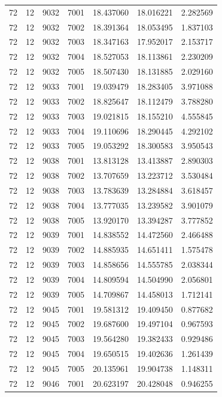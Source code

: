 \begin{table}
\begin{tabular}{rrrrrrr}
72 & 12 & 9032 & 7001 & 18.437060 & 18.016221 & 2.282569 \\
72 & 12 & 9032 & 7002 & 18.391364 & 18.053495 & 1.837103 \\
72 & 12 & 9032 & 7003 & 18.347163 & 17.952017 & 2.153717 \\
72 & 12 & 9032 & 7004 & 18.527053 & 18.113861 & 2.230209 \\
72 & 12 & 9032 & 7005 & 18.507430 & 18.131885 & 2.029160 \\
72 & 12 & 9033 & 7001 & 19.039479 & 18.283405 & 3.971088 \\
72 & 12 & 9033 & 7002 & 18.825647 & 18.112479 & 3.788280 \\
72 & 12 & 9033 & 7003 & 19.021815 & 18.155210 & 4.555845 \\
72 & 12 & 9033 & 7004 & 19.110696 & 18.290445 & 4.292102 \\
72 & 12 & 9033 & 7005 & 19.053292 & 18.300583 & 3.950543 \\
72 & 12 & 9038 & 7001 & 13.813128 & 13.413887 & 2.890303 \\
72 & 12 & 9038 & 7002 & 13.707659 & 13.223712 & 3.530484 \\
72 & 12 & 9038 & 7003 & 13.783639 & 13.284884 & 3.618457 \\
72 & 12 & 9038 & 7004 & 13.777035 & 13.239582 & 3.901079 \\
72 & 12 & 9038 & 7005 & 13.920170 & 13.394287 & 3.777852 \\
72 & 12 & 9039 & 7001 & 14.838552 & 14.472560 & 2.466488 \\
72 & 12 & 9039 & 7002 & 14.885935 & 14.651411 & 1.575478 \\
72 & 12 & 9039 & 7003 & 14.858656 & 14.555785 & 2.038344 \\
72 & 12 & 9039 & 7004 & 14.809594 & 14.504990 & 2.056801 \\
72 & 12 & 9039 & 7005 & 14.709867 & 14.458013 & 1.712141 \\
72 & 12 & 9045 & 7001 & 19.581312 & 19.409450 & 0.877682 \\
72 & 12 & 9045 & 7002 & 19.687600 & 19.497104 & 0.967593 \\
72 & 12 & 9045 & 7003 & 19.564280 & 19.382433 & 0.929486 \\
72 & 12 & 9045 & 7004 & 19.650515 & 19.402636 & 1.261439 \\
72 & 12 & 9045 & 7005 & 20.135961 & 19.904738 & 1.148311 \\
72 & 12 & 9046 & 7001 & 20.623197 & 20.428048 & 0.946255 \\

\end{tabular}
\end{table}
